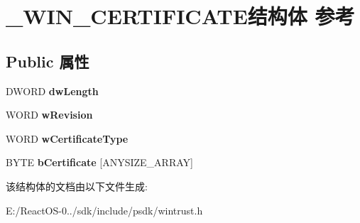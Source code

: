 \hypertarget{struct___w_i_n___c_e_r_t_i_f_i_c_a_t_e}{}\section{\+\_\+\+W\+I\+N\+\_\+\+C\+E\+R\+T\+I\+F\+I\+C\+A\+T\+E结构体 参考}
\label{struct___w_i_n___c_e_r_t_i_f_i_c_a_t_e}
\subsection*{Public 属性}
\begin{DoxyCompactItemize}
\item 
\mbox{\label{struct___w_i_n___c_e_r_t_i_f_i_c_a_t_e_aebe28ffe386210816448942c457b03d4}} 
D\+W\+O\+RD {\bfseries dw\+Length}
\item 
\mbox{\label{struct___w_i_n___c_e_r_t_i_f_i_c_a_t_e_a04ff0b38cfa0a3bf00382f7365219b69}} 
W\+O\+RD {\bfseries w\+Revision}
\item 
\mbox{\label{struct___w_i_n___c_e_r_t_i_f_i_c_a_t_e_af8ca53644f79d38934458fbd53e67458}} 
W\+O\+RD {\bfseries w\+Certificate\+Type}
\item 
\mbox{\label{struct___w_i_n___c_e_r_t_i_f_i_c_a_t_e_ab18f3d50dd6658e343710e4f0b1895df}} 
B\+Y\+TE {\bfseries b\+Certificate} \mbox{[}A\+N\+Y\+S\+I\+Z\+E\+\_\+\+A\+R\+R\+AY\mbox{]}
\end{DoxyCompactItemize}


该结构体的文档由以下文件生成\+:\begin{DoxyCompactItemize}
\item 
E\+:/\+React\+O\+S-\/0../sdk/include/psdk/wintrust.\+h\end{DoxyCompactItemize}

